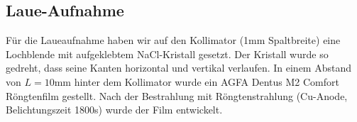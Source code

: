 \subsection{Laue-Aufnahme}
Für die Laueaufnahme haben wir auf den Kollimator (1\si{\milli\meter} Spaltbreite) eine Lochblende mit aufgeklebtem NaCl-Kristall gesetzt. Der Kristall wurde so gedreht, dass seine Kanten horizontal und vertikal verlaufen. In einem Abstand von $L = 10 \si{\milli\meter}$ hinter dem Kollimator wurde ein AGFA Dentus M2 Comfort Röngtenfilm gestellt. Nach der Bestrahlung mit Röngtenstrahlung (Cu-Anode, Belichtungszeit 1800s) wurde der Film entwickelt.  